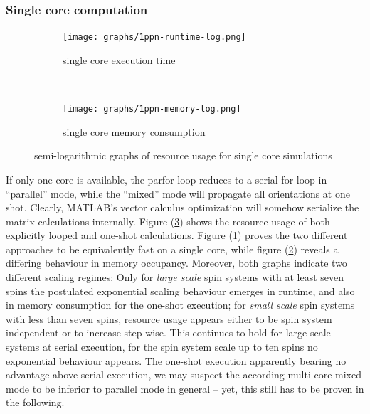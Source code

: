\documentclass[11.5pt,a4paper]{article}
\begin{document}
\subsubsection{Single core computation}
\begin{figure}
        \begin{subfigure}[b]{0.45\textwidth}
                \centering
                \texttt{[image: graphs/1ppn-runtime-log.png]}
                \caption{single core execution time}
                \label{fig-1ppn-runtime}
        \end{subfigure}
        ~ 
        \begin{subfigure}[b]{0.45\textwidth}
                \centering
                \texttt{[image: graphs/1ppn-memory-log.png]}
                \caption{single core memory consumption}
                \label{fig-1ppn-memory}
        \end{subfigure}
	\caption{semi-logarithmic graphs of resource usage for single core simulations}
	\label{fig-1ppn}
\end{figure}
If only one core is available, the parfor-loop reduces to a serial for-loop in ``parallel'' mode, while the ``mixed'' mode will propagate all orientations at one shot. Clearly, MATLAB's vector calculus optimization will somehow serialize the matrix calculations internally. Figure (\ref{fig-1ppn}) shows the resource usage of both explicitly looped and one-shot calculations. Figure (\ref{fig-1ppn-runtime}) proves the two different approaches to be equivalently fast on a single core, while figure (\ref{fig-1ppn-memory}) reveals a differing behaviour in memory occupancy. Moreover, both graphs indicate two different scaling regimes: Only for \emph{large scale} spin systems with at least seven spins the postulated exponential scaling behaviour emerges in runtime, and also in memory consumption for the one-shot execution; for \emph{small scale} spin systems with less than seven spins, resource usage appears either to be spin system independent or to increase step-wise. This continues to hold for large scale systems at serial execution, for the spin system scale up to ten spins no exponential behaviour appears. 
The one-shot execution apparently bearing no advantage above serial execution, we may suspect the according multi-core mixed mode to be inferior to parallel mode in general -- yet, this still has to be proven in the following.
\end{document}
